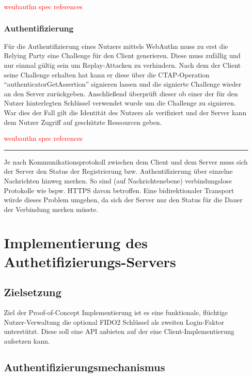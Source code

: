 \documentclass[journal]{IEEEtran}
\begin{document}
\textcolor{red}{weubauthn spec references}

\subsubsection{Authentifizierung}

Für die Authentifizierung eines Nutzers mittels WebAuthn muss zu erst die
Relying Party eine Challenge für den Client generieren. Diese muss zufällig und
nur einmal gültig sein um Replay-Attacken zu verhindern. Nach dem der Client
seine Challenge erhalten hat kann er diese über die CTAP-Operation
``authenticatorGetAssertion'' signieren lassen und die signierte Challenge
wieder an den Server zurückgeben. Anschließend überprüft dieser ob einer der
für den Nutzer hinterlegten Schlüssel verwendet wurde um die Challenge zu
signieren. War dies der Fall gilt die Identität des Nutzers als verifiziert und
der Server kann dem Nutzer Zugriff auf geschützte Ressourcen geben.

\textcolor{red}{weubauthn spec references}

\vspace{0.25em}
\rule{0.45\textwidth}{0.4pt}
\vspace{0.5em}

Je nach Kommunikationsprotokoll zwischen dem Client und dem Server muss sich
der Server den Status der Registrierung bzw. Authentifizierung über einzelne
Nachrichten hinweg merken. So sind (auf Nachrichtenebene) verbindungslose
Protokolle wie bspw. HTTPS davon betroffen. Eine bidirektionaler Transport
würde dieses Problem umgehen, da sich der Server nur den Status für die Dauer
der Verbindung merken müsste.

\section{Implementierung des Authetifizierungs-Servers}

\subsection{Zielsetzung}

Ziel der Proof-of-Concept Implementierung ist es eine funktionale,
flüchtige Nutzer-Verwaltung die optional FIDO2 Schlüssel als zweiten
Login-Faktor unterstützt. Diese soll eine API anbieten auf der eine
Client-Implementierung aufsetzen kann.

\subsection{Authentifizierungsmechanismus}
\end{document}
